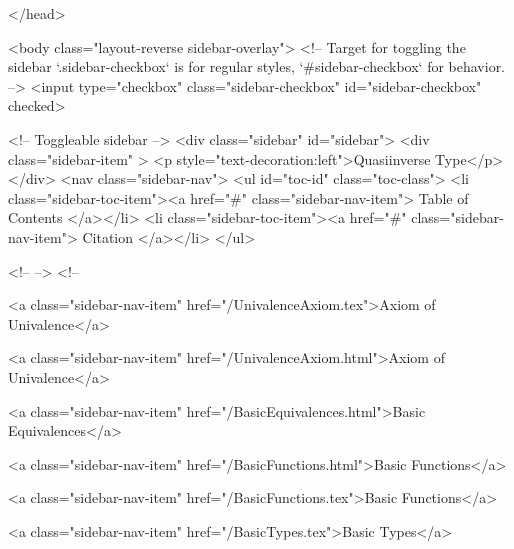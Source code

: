   
</head>




  <body class="layout-reverse sidebar-overlay">
    <!-- Target for toggling the sidebar `.sidebar-checkbox` is for regular
     styles, `#sidebar-checkbox` for behavior. -->
<input type="checkbox" class="sidebar-checkbox" id="sidebar-checkbox" checked>

<!-- Toggleable sidebar -->
<div class="sidebar" id="sidebar">
  <div class="sidebar-item" >
    <p style="text-decoration:left">Quasiinverse Type</p>
  </div>
  <nav class="sidebar-nav">
    <ul id="toc-id" class="toc-class">
  <li class="sidebar-toc-item"><a href="#" class="sidebar-nav-item"> Table of Contents </a></li>
  <li class="sidebar-toc-item"><a href="#" class="sidebar-nav-item"> Citation </a></li>
</ul>


    <!--  -->
    <!-- 
      
    
      
    
      
    
      
    
      
        
      
    
      
        
          <a class="sidebar-nav-item" href="/UnivalenceAxiom.tex">Axiom of Univalence</a>
        
      
    
      
        
          <a class="sidebar-nav-item" href="/UnivalenceAxiom.html">Axiom of Univalence</a>
        
      
    
      
        
          <a class="sidebar-nav-item" href="/BasicEquivalences.html">Basic Equivalences</a>
        
      
    
      
        
          <a class="sidebar-nav-item" href="/BasicFunctions.html">Basic Functions</a>
        
      
    
      
        
          <a class="sidebar-nav-item" href="/BasicFunctions.tex">Basic Functions</a>
        
      
    
      
        
          <a class="sidebar-nav-item" href="/BasicTypes.tex">Basic Types</a>
        
